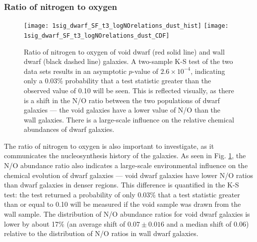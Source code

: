 \subsubsection{Ratio of nitrogen to oxygen}

\begin{figure}
    \centering
    \texttt{[image: 1sig\_dwarf\_SF\_t3\_logNOrelations\_dust\_hist]}
    \texttt{[image: 1sig\_dwarf\_SF\_t3\_logNOrelations\_dust\_CDF]}
    \caption{Ratio of nitrogen to oxygen of void dwarf (red solid line) and wall 
    dwarf (black dashed line) galaxies.  A two-sample K-S test of the two data 
    sets results in an asymptotic $p$-value of $2.6\times 10^{-4}$, indicating 
    only a 0.03\% probability that a test statistic greater than the observed 
    value of 0.10 will be seen.  This is reflected visually, as there is a shift 
    in the N/O ratio between the two populations of dwarf galaxies --- the void 
    galaxies have a lower value of N/O than the wall galaxies.  There is a 
    large-scale influence on the relative chemical abundances of dwarf 
    galaxies.}
    \label{fig:NOratio}
\end{figure}

The ratio of nitrogen to oxygen is also important to investigate, as it 
communicates the nucleosynthesis history of the galaxies.  As seen in Fig. 
\ref{fig:NOratio}, the N/O abundance ratio also indicates a large-scale 
environmental influence on the chemical evolution of dwarf galaxies --- void 
dwarf galaxies have lower N/O ratios than dwarf galaxies in denser regions.  
This difference is quantified in the K-S test: the test returned a probability of 
only 0.03\% that a test statistic greater than or equal to 0.10 will be measured 
if the void sample was drawn from the wall sample.  The distribution of N/O 
abundance ratios for void dwarf galaxies is lower by about 17\% (an average 
shift of $0.07\pm 0.016$ and a median shift of 0.06) relative to the 
distribution of N/O ratios in wall dwarf galaxies.



